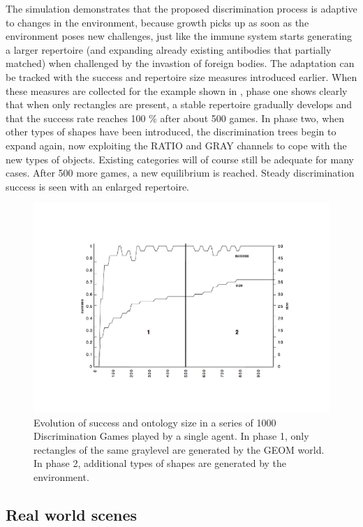 The simulation demonstrates
that the proposed discrimination process is adaptive to
changes in the environment, because growth picks up
as soon as the environment poses new challenges, just 
like the immune system starts generating a larger 
repertoire (and expanding already existing antibodies
that partially matched)
when challenged by the invastion of foreign bodies. 
The adaptation can be tracked with the success and 
repertoire size measures introduced earlier. 
When these measures are collected for the example shown in 
, phase one shows clearly that 
when only rectangles are present, a stable 
repertoire gradually develops and that the success rate reaches 100 \%
after about 500 games. In phase two, when other types of 
shapes have been introduced,
the discrimination trees begin to expand again, now exploiting the
RATIO and GRAY channels to cope with the new types of objects.
Existing categories will of course still be adequate for 
many cases. After 500 more games, a new equilibrium
is reached. Steady discrimination success is seen with an 
enlarged repertoire.

\begin{figure}[htbp]
  \centerline{\includegraphics[width=\textwidth]{chap4/figs/adptwrlglo.pdf}}
\caption{\label{adptwrlglo}Evolution of success and ontology
size in a series of 1000 Discrimination Games played by a single agent.
In phase 1, only rectangles of the same graylevel are 
generated by the GEOM world. In phase 2, additional types of 
shapes are generated by the environment.}
\end{figure}

\subsection{Real world scenes}

